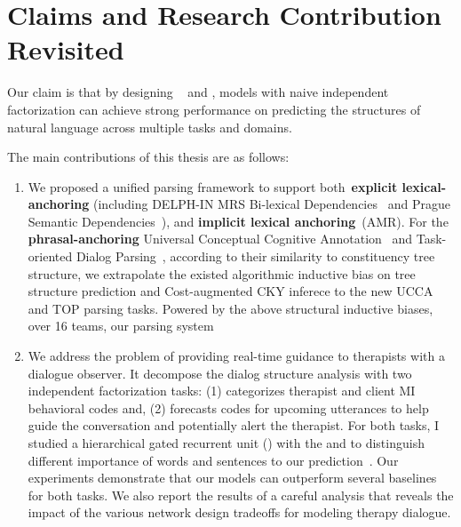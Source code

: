 \section{Claims and Research Contribution Revisited}
\label{sec:conclustions:claims}

 Our claim is that by designing
~ and , models with naive independent factorization can achieve
strong performance on predicting the structures of natural language
across multiple tasks and domains.

 The main contributions of this thesis are as
follows:

\begin{enumerate}
\item We proposed a unified parsing framework to support
  both~\textbf{explicit lexical-anchoring} (including DELPH-IN MRS
  Bi-lexical Dependencies~\citep[DM,][]{ivanova2012did} and Prague
  Semantic
  Dependencies~\citep[PSD,][]{hajic2012announcing,miyao2014house}),
  and \textbf{implicit lexical anchoring}~(AMR). For the
  \textbf{phrasal-anchoring} Universal Conceptual Cognitive
  Annotation~\citep[UCCA,][]{abend2013universal} and Task-oriented
  Dialog Parsing~\citep[TOP,][]{gupta-etal-2018-semantic-parsing},
  according to their similarity to constituency tree structure, we
  extrapolate the existed algorithmic inductive bias on tree structure
  prediction and Cost-augmented CKY inferece to the new UCCA and TOP
  parsing tasks. Powered by the above structural inductive biases,
  over 16 teams, our parsing system~\citep{cao2019amazon} 

\item We address the problem of providing real-time guidance to
  therapists with a dialogue observer. It decompose the dialog
  structure analysis with two independent factorization tasks: (1)
  categorizes therapist and client MI behavioral codes and, (2)
  forecasts codes for upcoming utterances to help guide the
  conversation and potentially alert the therapist. For both tasks, I
  studied a hierarchical gated recurrent unit (\HGRU) with the
   and  to
  distinguish different importance of words and sentences to our
  prediction~\citep{jie2019psycdialacl}. Our experiments demonstrate
  that our models can outperform several baselines for both tasks.  We
  also report the results of a careful analysis that reveals the
  impact of the various network design tradeoffs for modeling therapy
  dialogue.


\end{enumerate}
